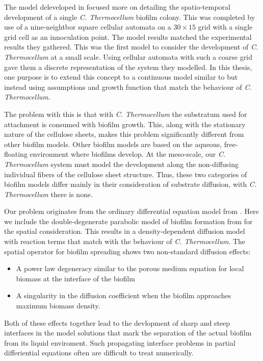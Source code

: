 The model deleveloped in \cite{wang2011spatial} focused more on detailing the spatio-temporal development of a single \textit{C. Thermocellum} biofilm colony.
This was completed by use of a nine-neightbor square cellular automata on a $30 \times 15$ grid with a single grid cell as an innoculation point.
The model results matched the experimental results they gathered.
This was the first model to consider the development of \textit{C. Thermocellum} at a small scale.
Using cellular automata with such a coarse grid gave them a discrete representation of the system they modelled.
In this thesis, one purpose is to extend this concept to a continuous model similar to \cite{eberl2007finite} but instead using assumptions and growth function that match the behaviour of \textit{C. Thermocellum}.

The problem with this is that with \textit{C. Thermocellum} the substratum used for attachment is consumed with biofilm growth.
This, along with the stationary nature of the cellulose sheets, makes this problem significantly different from other biofilm models.
Other biofilm models are based on the aqueous, free-floating environment where biofilms develop.
At the meso-scale, our \textit{C. Thermocellum} system must model the development along the non-diffusing individual fibers of the cellulose sheet structure.
Thus, these two categories of biofilm models differ mainly in their consideration of substrate diffusion, with \textit{C. Thermocellum} there is none.


Our problem originates from the ordinary differential equation model from \cite{dumitrache2015mathematicalModeling}.
Here we include the double-degenerate parabolic model of biofilm formation from \cite{eberl2001deterministic} for the spatial consideration.
This results in a density-dependent diffusion model with reaction terms that match with the behaviour of \textit{C. Thermocellum}.
The spatial operator for biofilm spreading shows two non-standard diffusion effects:
\begin{itemize} 
  \item A power law degeneracy similar to the porous medium equation for local biomass at the interface of the biofilm \cite{gurtin1977diffusion}
  \item A singularity in the diffusion coefficient when the biofilm approaches maximum biomass density. 
\end{itemize}
Both of these effects together lead to the devlopment of sharp and steep interfaces in the model solutions that mark the separation of the actual biofilm from its liquid enviroment.
Such propagating interface problems in partial differiential equations often are difficult to treat numerically.

